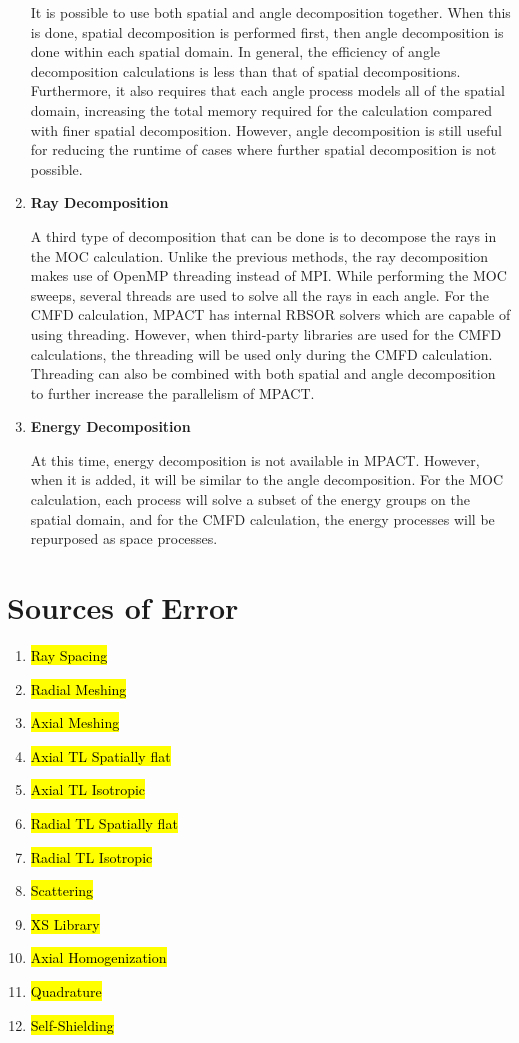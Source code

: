 \begin{enumerate}[leftmargin=*]
It is possible to use both spatial and angle decomposition together.  When this is done, spatial decomposition is performed first, then angle decomposition is done within each spatial domain.  In general, the efficiency of angle decomposition calculations is less than that of spatial decompositions.  Furthermore, it also requires that each angle process models all of the spatial domain, increasing the total memory required for the calculation compared with finer spatial decomposition.  However, angle decomposition is still useful for reducing the runtime of cases where further spatial decomposition is not possible.

\item \textbf{Ray Decomposition}

A third type of decomposition that can be done is to decompose the rays in the MOC calculation.  Unlike the previous methods, the ray decomposition makes use of OpenMP threading instead of MPI.  While performing the MOC sweeps, several threads are used to solve all the rays in each angle.  For the CMFD calculation, MPACT has internal RBSOR solvers which are capable of using threading.  However, when third-party libraries are used for the CMFD calculations, the threading will be used only during the CMFD calculation.  Threading can also be combined with both spatial and angle decomposition to further increase the parallelism of MPACT.

\item \textbf{Energy Decomposition}

At this time, energy decomposition is not available in MPACT.  However, when it is added, it will be similar to the angle decomposition.  For the MOC calculation, each process will solve a subset of the energy groups on the spatial domain, and for the CMFD calculation, the energy processes will be repurposed as space processes.
\end{enumerate}

\section{Sources of Error}

\begin{enumerate}[leftmargin=*]
\item \hl{Ray Spacing}
\item \hl{Radial Meshing}
\item \hl{Axial Meshing}
\item \hl{Axial TL Spatially flat}
\item \hl{Axial TL Isotropic}
\item \hl{Radial TL Spatially flat}
\item \hl{Radial TL Isotropic}
\item \hl{Scattering}
\item \hl{XS Library}
\item \hl{Axial Homogenization}
\item \hl{Quadrature}
\item \hl{Self-Shielding}
\end{enumerate}

